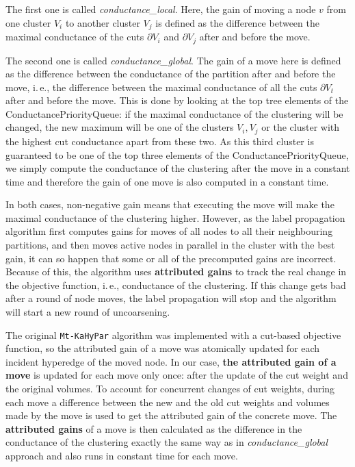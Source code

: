 \documentclass[acmsmall,nonacm,screen,review]{acmart}
\newcommand{\ie}{i.\,e.,\xspace}
\begin{document}
The first one is called \textit{conductance\_local}. Here, the gain of
moving a node $v$ from one cluster $V_i$ to another cluster $V_j$ is
defined as the difference between the maximal conductance of the 
cuts $\partial V_i$ and $\partial V_j$ after and before the move.

The second one is called \textit{conductance\_global}. The gain of a move
here is defined as the difference between the conductance of the partition 
after and before the move, \ie the difference between the maximal conductance
of all the cuts $\partial V_t$ after and before the move. This is done by
looking at the top tree elements of the ConductancePriorityQueue: if the maximal
conductance of the clustering will be changed, the new maximum will be
one of the clusters $V_i, V_j$ or the cluster with the highest cut conductance
apart from these two. As this third cluster is guaranteed to be one of the
top three elements of the ConductancePriorityQueue, we simply compute the 
conductance of the clustering after the move in a constant time and therefore
the gain of one move is also computed in a constant time.

\smallskip
In both cases, non-negative gain means that executing the move will 
make the maximal conductance of the clustering higher. However,
as the label propagation algorithm first computes gains for moves
of all nodes to all their neighbouring partitions, and then moves
active nodes in parallel in the cluster with the best gain, it can so 
happen that some or all of the precomputed gains are incorrect.
Because of this, the algorithm uses \textbf{attributed gains} to
track the real change in the objective function, \ie conductance 
of the clustering. If this change gets bad after a round of node moves,
the label propagation will stop and the algorithm will start a new round
of uncoarsening.

The original \texttt{Mt-KaHyPar} algorithm was implemented
with a cut-based objective function, so the attributed gain of a move
was atomically updated for each incident hyperedge of the moved node.
In our case, \textbf{the attributed gain of a move} is updated for each move 
only once: after the update of the cut weight and the original volumes.
To account for concurrent changes of cut weights, during each move
a difference between the new and the old cut weights and volumes
made by the move is used to get the attributed gain of the concrete move.
The \textbf{attributed gains} of a move is then calculated as the difference
in the conductance of the clustering exactly the same way as in 
\textit{conductance\_global} approach and also runs in constant time for 
each move. 
\end{document}
